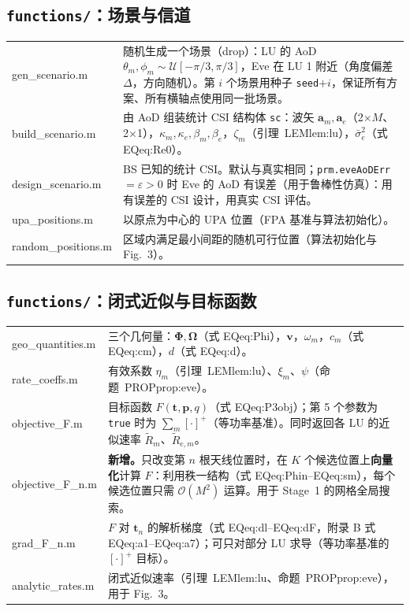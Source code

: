 \documentclass[11pt,a4paper]{ctexart}
\newcommand{\code}[1]{\texttt{#1}}
\newcommand{\bt}{\mathbf t}
\begin{document}
\subsection{\code{functions/}：场景与信道}
\begin{longtable}{>{\ttfamily\small}p{4.6cm}p{11.2cm}}
\toprule
gen\_scenario.m & 随机生成一个场景（drop）：LU 的 AoD $\theta_m,\phi_m\sim\mathcal U[-\pi/3,\pi/3]$，Eve 在 LU 1 附近（角度偏差 $\Delta$，方向随机）。第 $i$ 个场景用种子 \code{seed}$+i$，保证所有方案、所有横轴点使用同一批场景。\\
build\_scenario.m & 由 AoD 组装统计 CSI 结构体 \code{sc}：波矢 $\mathbf a_m,\mathbf a_e$（2$\times M$、2$\times$1），$\kappa_m,\kappa_e,\beta_m,\beta_e$，$\zeta_m$（引理~LEM{lem:lu}），$\bar\sigma_e^2$（式 EQ{eq:Re0}）。\\
design\_scenario.m & BS 已知的统计 CSI。默认与真实相同；\code{prm.eveAoDErr}$=\varepsilon>0$ 时 Eve 的 AoD 有误差（用于鲁棒性仿真）：用有误差的 CSI 设计，用真实 CSI 评估。\\
upa\_positions.m & 以原点为中心的 UPA 位置（FPA 基准与算法初始化）。\\
random\_positions.m & 区域内满足最小间距的随机可行位置（算法初始化与 Fig.~3）。\\
\bottomrule
\end{longtable}

\subsection{\code{functions/}：闭式近似与目标函数}
\begin{longtable}{>{\ttfamily\small}p{4.6cm}p{11.2cm}}
\toprule
geo\_quantities.m & 三个几何量：$\boldsymbol\Phi,\boldsymbol\Omega$（式 EQ{eq:Phi}），$\mathbf v$，$\omega_m$，$c_m$（式 EQ{eq:cm}），$d$（式 EQ{eq:d}）。\\
rate\_coeffs.m & 有效系数 $\eta_m$（引理~LEM{lem:lu}）、$\xi_m$、$\psi$（命题~PROP{prop:eve}）。\\
objective\_F.m & 目标函数 $F(\bt,\mathbf p,q)$（式 EQ{eq:P3obj}）；第 5 个参数为 \code{true} 时为 $\sum_m[\cdot]^+$（等功率基准）。同时返回各 LU 的近似速率 $\tilde R_m$、$\tilde R_{e,m}$。\\
objective\_F\_n.m & \textbf{新增。}只改变第 $n$ 根天线位置时，在 $K$ 个候选位置上\textbf{向量化}计算 $F$：利用秩一结构（式 EQ{eq:Phin}--EQ{eq:sm}），每个候选位置只需 $\mathcal O(M^2)$ 运算。用于 Stage~1 的网格全局搜索。\\
grad\_F\_n.m & $F$ 对 $\bt_n$ 的解析梯度（式 EQ{eq:dl}--EQ{eq:dF}，附录 B 式 EQ{eq:a1}--EQ{eq:a7}）；可只对部分 LU 求导（等功率基准的 $[\cdot]^+$ 目标）。\\
analytic\_rates.m & 闭式近似速率（引理~LEM{lem:lu}、命题~PROP{prop:eve}），用于 Fig.~3。\\
\bottomrule
\end{longtable}
\end{document}
